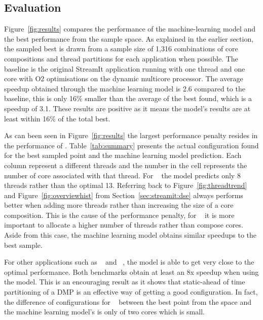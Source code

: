 \subsection{Evaluation}

Figure~\ref{fig:results} compares the performance of the machine-learning model and the best performance from the sample space.
As explained in the earlier section, the sampled best is drawn from a sample size of 1,316 combinations of core compositions and thread partitions for each application when possible.
The baseline is the original StreamIt application running with one thread and one core with O2 optimisations on the dynamic multicore processor.
The average speedup obtained through the machine learning model is 2.6 compared to the baseline, this is only 16\% smaller than the average of the best found, which is a speedup of 3.1.
These results are positive as it means the model's results are at least within 16\% of the total best.

As can been seen in Figure~\ref{fig:results} the largest performance penalty resides in the performance of .
Table~\ref{tab:summary} presents the actual configuration found for the best sampled point and the machine learning model prediction.
Each column represent a different threads and the number in the cell represents the number of core associated with that thread.
For ~ the model predicts only 8 threads rather than the optimal 13.
Referring back to Figure~\ref{fig:threadtrend} and Figure~\ref{fig:overviewhist} from Section~\ref{sec:streamit:dse}  always performs better when adding more threads rather than increasing the size of a core composition.
This is the cause of the performance penalty, for ~ it is more important to allocate a higher number of threads rather than compose cores.
Aside from this case, the machine learning model obtains similar speedups to the best sample.

For other applications such as ~ and ~, the model is able to get very close to the optimal performance.
Both benchmarks obtain at least an 8x speedup when using the model.
This is an encouraging result as it shows that static-ahead of time partitioning of a DMP is an effective way of getting a good configuration.
In fact, the difference of configurations for ~ between the best point from the space and the machine learning model's is only of two cores which is small.


